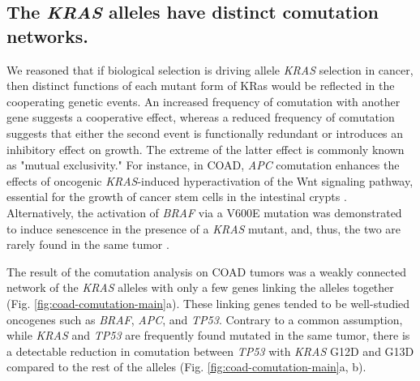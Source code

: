 \documentclass[english, 10pt, letterpaper]{article}
\newcommand{\KRAS}{\emph{KRAS}}
\newcommand{\kras}{KRas}
\begin{document}
\subsection*{The \KRAS{} alleles have distinct comutation networks.}

We reasoned that if biological selection is driving allele \KRAS{} selection in cancer, then distinct functions of each mutant form of \kras{} would be reflected in the cooperating genetic events. 
An increased frequency of comutation with another gene suggests a cooperative effect, whereas a reduced frequency of comutation suggests that either the second event is functionally redundant or introduces an inhibitory effect on growth.
The extreme of the latter effect is commonly known as "mutual exclusivity."
For instance, in COAD, \emph{APC} comutation enhances the effects of oncogenic \KRAS{}-induced hyperactivation of the Wnt signaling pathway, essential for the growth of cancer stem cells in the intestinal crypts \cite{Janssen2006, Fearon2014, Sakai2018, Jauhri2017}.
Alternatively, the activation of \emph{BRAF} via a V600E mutation was demonstrated to induce senescence in the presence of a \KRAS{} mutant, and, thus, the two are rarely found in the same tumor \cite{Seth2009ConcomitantCancer., Cisowski2016, Jauhri2017}.

The result of the comutation analysis on COAD tumors was a weakly connected network of the \KRAS{} alleles with only a few genes linking the alleles together (Fig. \ref{fig:coad-comutation-main}a).
These linking genes tended to be well-studied oncogenes such as \emph{BRAF}, \emph{APC}, and \emph{TP53}.
Contrary to a common assumption, while \KRAS{} and \emph{TP53} are frequently found mutated in the same tumor, there is a detectable reduction in comutation between \emph{TP53} with \KRAS{} G12D and G13D compared to the rest of the alleles (Fig. \ref{fig:coad-comutation-main}a, b).
\end{document}

